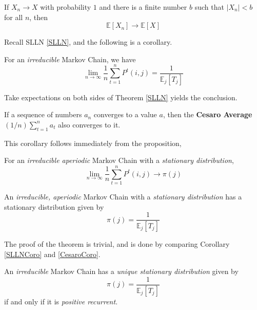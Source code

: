 \begin{lemma}\label{BCT}
    If $X_n \to X$ with probability $1$ and there is a finite number $b$ such that $|X_n| < b$ for all $n$, then
    \[ \mathbb{E}[X_n] \to \mathbb{E}[X] \]
\end{lemma}

Recall SLLN \ref{SLLN}, and the following is a corollary.
\begin{corollary}\label{SLLNCoro}
    For an \emph{irreducible} Markov Chain, we have
    \[ \lim_{n\to\infty} \frac{1}{n}\sum_{t=1}^n P^t(i,j) = \frac{1}{\mathbb{E}_j[T_j]} \]
\end{corollary}
\begin{sketchproof}
    Take expectations on both sides of Theorem \ref{SLLN} yields the conclusion.
\end{sketchproof}

\begin{proposition}
    If a sequence of numbers $a_n$ converges to a value $a$, then the \textbf{Cesaro Average} $(1/n)\sum_{t=1}^na_t$ also converges to it.
\end{proposition}
This corollary follows immediately from the proposition,
\begin{corollary}\label{CesaroCoro}
    For an \emph{irreducible aperiodic} Markov Chain with a \emph{stationary distribution},
    \[ \lim_{n\to\infty}\frac{1}{n}\sum_{t=1}^nP^t(i,j) \to \pi(j) \]
\end{corollary}
\begin{theorem}
    An \emph{irreducible, aperiodic} Markov Chain with a \emph{stationary distribution} has a stationary distribution given by
    \[ \pi(j) = \frac{1}{\mathbb{E}_j[T_j]} \]
\end{theorem}
\begin{sketchproof}
    The proof of the theorem is trivial, and is done by comparing Corollary \ref{SLLNCoro} and \ref{CesaroCoro}.
\end{sketchproof}

\begin{theorem}
    An \emph{irreducible} Markov Chain has a \emph{unique stationary distribution} given by
    \[ \pi(j) = \frac{1}{\mathbb{E}_j[T_j]} \]
    if and only if it is \emph{positive recurrent}.
\end{theorem}

